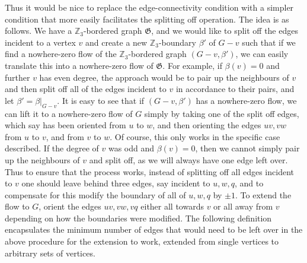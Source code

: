 \documentclass{article}
\newcommand{\Z}{\mathbb{Z}_3}
\newcommand\g{\mathfrak{G}}
\begin{document}
Thus it would be nice to replace the edge-connectivity
condition with a simpler condition that more easily facilitates the splitting
off operation. The idea is as follows. We have a $\Z$-bordered graph $\g$, and
we would like to split off the edges incident to a vertex $v$ and create a new
$\Z$-boundary $\beta'$ of $G-v$  such that if we find a nowhere-zero flow of
the $\Z$-bordered graph $(G-v,\beta')$, we can easily translate this into a
nowhere-zero flow of $\g$. For example, if $\beta(v) = 0$ and further $v$ has
even degree, the approach would be to pair up the neighbours of $v$ and then
split off all of the edges incident to $v$ in accordance to their pairs, and
let $\beta' = \beta|_{G-v}$. It is easy to see that if $(G-v,\beta')$ has a
nowhere-zero flow, we can lift it to a nowhere-zero flow of $G$ simply by
taking one of the split off edges, which say has been oriented from $u$ to $w$,
and then orienting the edges $uv,vw$ from $u$ to $v$, and from $v$ to $w$. Of
course, this only works in  the specific case described. If the degree of $v$
was odd and $\beta(v) =0$, then we cannot simply pair up the neighbours of $v$
and split off, as we will always have one edge left over. Thus to ensure that
the process works, instead of splitting off all edges incident to $v$ one
should leave behind three edges, say incident to $u,w,q$, and to compensate for
this modify the boundary of all of $u,w,q$ by $\pm 1$. To extend the flow to
$G$, orient the edges $uv,vw,vq$ either all towards $v$ or all away from $v$
depending on how the boundaries were modified. The following definition
encapsulates the minimum number of edges that would need to be left over in the
above procedure for the extension to work, extended from single vertices to
arbitrary sets of vertices. 
\end{document}
